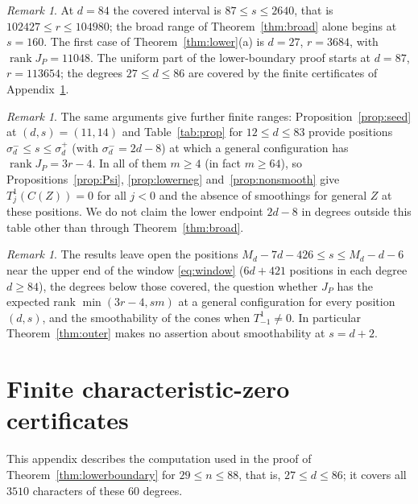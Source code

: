 \documentclass{amsart}
\theoremstyle{definition}
\theoremstyle{remark}
\newtheorem{remark}[theorem]{Remark}
\numberwithin{equation}{section}
\DeclareMathOperator{\rank}{rank}
\begin{document}
\begin{remark}\label{rem:numbers}
At $d=84$ the covered interval is $87\le s\le2640$, that is $102427\le r\le104980$; the
broad range of Theorem~\ref{thm:broad} alone begins at $s=160$. The first case of
Theorem~\ref{thm:lower}(a) is $d=27$, $r=3684$, with $\rank J_P=11048$. The uniform part of
the lower-boundary proof starts at $d=87$, $r=113654$; the degrees $27\le d\le86$ are
covered by the finite certificates of Appendix~\ref{app:finite}.
\end{remark}

\begin{remark}\label{rem:finiterange}
The same arguments give further finite ranges: Proposition~\ref{prop:seed} at
$(d,s)=(11,14)$ and Table~\ref{tab:prop} for $12\le d\le83$ provide positions
$\sigma^-_d\le s\le\sigma^+_d$ (with $\sigma^-_d=2d-8$) at which a general configuration has
$\rank J_P=3r-4$. In all of them $m\ge4$ (in fact $m\ge64$), so
Propositions~\ref{prop:Psi}, \ref{prop:lowerneg} and~\ref{prop:nonsmooth} give
$T^1_j(C(Z))=0$ for all $j<0$ and the absence of smoothings for general $Z$ at these
positions. We do not claim the lower endpoint $2d-8$ in degrees outside this table other
than through Theorem~\ref{thm:broad}.
\end{remark}

\begin{remark}\label{rem:scope}
The results leave open the positions $M_d-7d-426\le s\le M_d-d-6$ near the upper end of
the window \eqref{eq:window} ($6d+421$ positions in each degree $d\ge84$), the degrees
below those covered, the question whether $J_P$ has the expected rank $\min(3r-4,sm)$ at a
general configuration for every position $(d,s)$, and the smoothability of the cones when
$T^1_{-1}\ne0$. In particular Theorem~\ref{thm:outer} makes no assertion about
smoothability at $s=d+2$.
\end{remark}

\appendix
\section{Finite characteristic-zero certificates}\label{app:finite}

This appendix describes the computation used in the proof of
Theorem~\ref{thm:lowerboundary} for $29\le n\le88$, that is, $27\le d\le86$; it covers all
$3510$ characters of these $60$ degrees.
\end{document}
